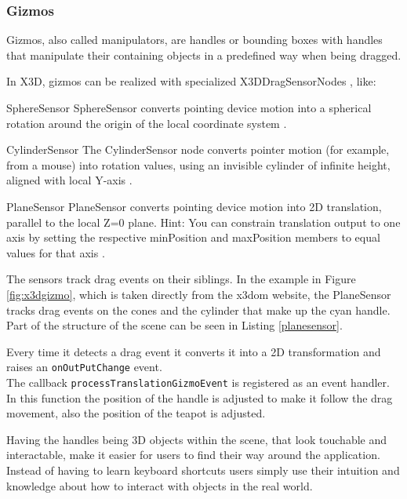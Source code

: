 \subsubsection{Gizmos}\label{gizmos}

Gizmos, also called manipulators, are handles or bounding boxes with
handles that manipulate their containing objects in a predefined way when
being dragged. \cite{wikigizmo}

In \gls{X3D}, gizmos can be realized with specialized X3DDragSensorNodes \cite{x3ddragsensornode}, like:

\begin{description*}
\item[SphereSensor]
  SphereSensor converts pointing device motion into a spherical rotation around the origin of the local coordinate system \cite{spheresensor}.
\item[CylinderSensor]
  The CylinderSensor node converts pointer motion (for example, from a mouse) into rotation values, using an invisible cylinder of infinite height, aligned with local Y-axis \cite{cylindersensor}.
\item[PlaneSensor]
  PlaneSensor converts pointing device motion into 2D translation, parallel to the local Z=0 plane. Hint: You can constrain translation output to one axis by setting the respective minPosition and maxPosition members to equal values for that axis \cite{planesensor}.
\end{description*}

The sensors track drag events on their siblings. In the example in Figure
\ref{fig:x3dgizmo}, which is taken directly from the x3dom website, the
PlaneSensor tracks drag events on the cones and the cylinder that make up the
cyan handle. Part of the structure of the scene can be seen in Listing
\ref{planesensor}.

Every time it detects a drag event it converts it into a 2D
transformation and raises an \texttt{onOutPutChange} event.\\
The callback \texttt{processTranslationGizmoEvent} is registered as an event handler.
In this function the position of the handle is adjusted to make it
follow the drag movement, also the position of the teapot is adjusted.

Having the handles being \gls{3D} objects within the scene, that look
touchable and interactable, make it easier for users to find their way
around the application. Instead of having to learn keyboard shortcuts
users simply use their intuition and knowledge about how to interact with
objects in the real world.

